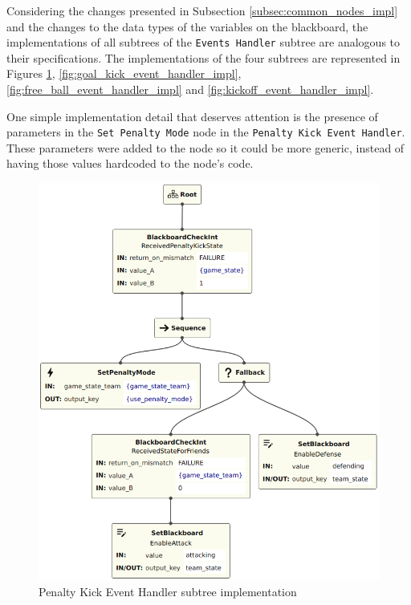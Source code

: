 Considering the changes presented in Subsection \ref{subsec:common_nodes_impl} and the changes to the data types of the variables on the blackboard, the implementations of all subtrees of the \texttt{Events Handler} subtree are analogous to their specifications. The implementations of the four subtrees are represented in Figures \ref{fig:penalty_kick_event_handler_impl}, \ref{fig:goal_kick_event_handler_impl}, \ref{fig:free_ball_event_handler_impl} and \ref{fig:kickoff_event_handler_impl}.

One simple implementation detail that deserves attention is the presence of parameters in the \texttt{Set Penalty Mode} node in the \texttt{Penalty Kick Event Handler}. These parameters were added to the node so it could be more generic, instead of having those values hardcoded to the node's code.

\begin{figure}[!h]
    \centering
    \includegraphics[width=0.7\linewidth]{chapters/development/images/PenaltyKickEventHandler.png}
    \caption{Penalty Kick Event Handler subtree implementation}
    \label{fig:penalty_kick_event_handler_impl}
\end{figure}

